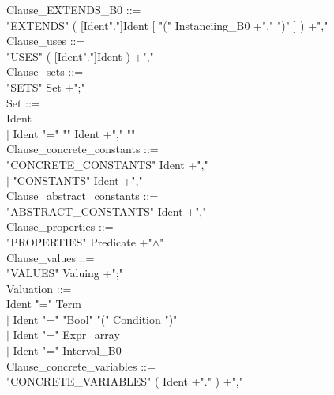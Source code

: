 \documentclass[12pt,a4paper,draft]{article}
\begin{document}
{\begin{sloppypar}
Clause\_EXTENDS\_B0 ::= \\
\hspace*{0.20in}  "EXTENDS" ( [Ident"."]Ident  [ "(" Instanciing\_B0 +","  ")" ] ) +","\\
Clause\_uses ::= \\
\hspace*{0.20in}  "USES" ( [Ident"."]Ident ) +","\\
Clause\_sets ::= \\
\hspace*{0.20in}  "SETS" Set +";"\\
Set ::= \\
\hspace*{0.20in}  Ident \\
\hspace*{0.20in} $|$ Ident  "="  "{" Ident +","  "}" \\
Clause\_concrete\_constants ::= \\
\hspace*{0.20in}  "CONCRETE\_CONSTANTS"  Ident +","\\
\hspace*{0.20in} $|$ "CONSTANTS"  Ident +","\\
Clause\_abstract\_constants ::= \\
\hspace*{0.20in}  "ABSTRACT\_CONSTANTS"  Ident +","\\
Clause\_properties ::= \\
\hspace*{0.20in}  "PROPERTIES"  Predicate +"$\land$"\\
Clause\_values ::= \\
\hspace*{0.20in}  "VALUES"  Valuing +";"\\
Valuation  ::= \\
\hspace*{0.20in}  Ident  "="  Term\\
\hspace*{0.20in} $|$ Ident  "="  "Bool" "(" Condition ")" \\
\hspace*{0.20in} $|$ Ident  "="  Expr\_array\\
\hspace*{0.20in} $|$ Ident  "="  Interval\_B0\\
Clause\_concrete\_variables ::= \\
\hspace*{0.20in}  "CONCRETE\_VARIABLES"  ( Ident +"."  ) +","\\

\end{sloppypar}}
\end{document}
